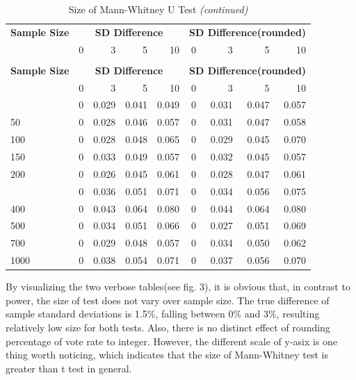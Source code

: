 \documentclass[]{article}
\begin{document}
\begin{longtable}[t]{lrrrrrrrr}
\caption{\label{tab:size-tables}Size of Mann-Whitney U Test}\\
\toprule
\multicolumn{1}{c}{\bfseries Sample Size} & \multicolumn{4}{c}{\bfseries SD Difference} & \multicolumn{4}{c}{\bfseries SD Difference(rounded)} \\
\cmidrule(l{2pt}r{2pt}){1-1} \cmidrule(l{2pt}r{2pt}){2-5} \cmidrule(l{2pt}r{2pt}){6-9}
  & 0 & 3 & 5 & 10 & 0 & 3 & 5 & 10\\
\midrule
\endfirsthead
\caption[]{Size of Mann-Whitney U Test \textit{(continued)}}\\
\toprule
\multicolumn{1}{c}{\bfseries Sample Size} & \multicolumn{4}{c}{\bfseries SD Difference} & \multicolumn{4}{c}{\bfseries SD Difference(rounded)} \\
\cmidrule(l{2pt}r{2pt}){1-1} \cmidrule(l{2pt}r{2pt}){2-5} \cmidrule(l{2pt}r{2pt}){6-9}
  & 0 & 3 & 5 & 10 & 0 & 3 & 5 & 10\\
\midrule
\endhead
\
\endfoot
\bottomrule
\endlastfoot
10 & 0 & 0.029 & 0.041 & 0.049 & 0 & 0.031 & 0.047 & 0.057\\
50 & 0 & 0.028 & 0.046 & 0.057 & 0 & 0.031 & 0.047 & 0.058\\
100 & 0 & 0.028 & 0.048 & 0.065 & 0 & 0.029 & 0.045 & 0.070\\
150 & 0 & 0.033 & 0.049 & 0.057 & 0 & 0.032 & 0.045 & 0.057\\
200 & 0 & 0.026 & 0.045 & 0.061 & 0 & 0.028 & 0.047 & 0.061\\
\addlinespace
300 & 0 & 0.036 & 0.051 & 0.071 & 0 & 0.034 & 0.056 & 0.075\\
400 & 0 & 0.043 & 0.064 & 0.080 & 0 & 0.044 & 0.064 & 0.080\\
500 & 0 & 0.034 & 0.051 & 0.066 & 0 & 0.027 & 0.051 & 0.069\\
700 & 0 & 0.029 & 0.048 & 0.057 & 0 & 0.034 & 0.050 & 0.062\\
1000 & 0 & 0.038 & 0.054 & 0.071 & 0 & 0.037 & 0.056 & 0.070\\*
\end{longtable}

By visualizing the two verbose tables(see fig. 3), it is obvious that,
in contrast to power, the size of test does not vary over sample size.
The true difference of sample standard deviations is 1.5\%, falling
between 0\% and 3\%, resulting relatively low size for both tests. Also,
there is no distinct effect of rounding percentage of vote rate to
integer. However, the different scale of y-asix is one thing worth
noticing, which indicates that the size of Mann-Whitney test is greater
than t test in general.
\end{document}
